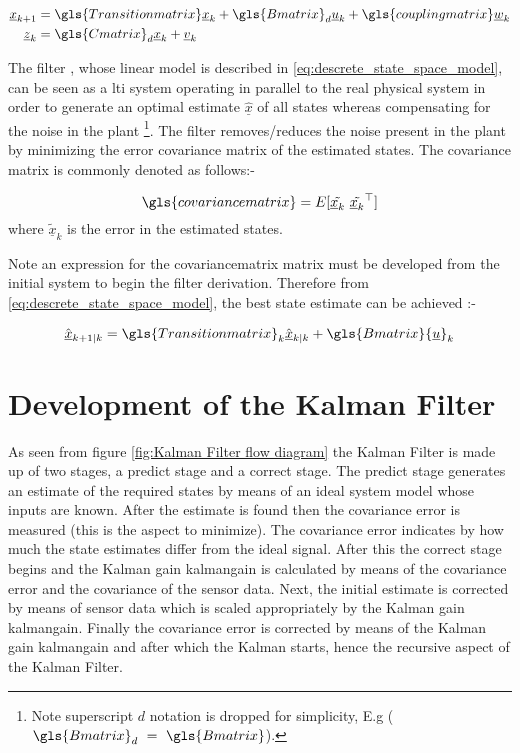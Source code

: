\begin{equation}\label{eq:descrete_state_space_model}
\begin{split}
\underline{x}_{k+1} &= \gls{Transitionmatrix} \underline{x}_k + \gls{Bmatrix}_d\underline{u}_k + \gls{couplingmatrix}\underline{w}_k \\
\underline{z}_{k}      &= \gls{Cmatrix}_d \underline{x}_k + \underline{v}_k
\end{split}
\end{equation}


The filter , whose linear model is described in \ref{eq:descrete_state_space_model}, can be seen as a \gls{lti}  system operating in parallel to the real physical system in order to generate an optimal estimate  $\underline{\hat{x}}$ of all states whereas compensating for the noise in the plant \footnote{Note superscript $d$ notation is dropped for simplicity, E.g ($\gls{Bmatrix} _d~=~ \gls{Bmatrix} $).}. The filter removes/reduces the noise present in the plant by minimizing the error covariance matrix of the estimated states. The covariance matrix is commonly denoted as follows:- 

\begin{equation}
\gls{covariancematrix}= E[\tilde{\underline{x}_k}~{\tilde{\underline{x}_k}}^\top]
\end{equation}
where ${\tilde{\underline{x}}}_k$ is the error in the estimated states.

Note an expression for the \gls{covariancematrix} matrix must be developed from the initial system to begin the filter derivation. Therefore from \eqref{eq:descrete_state_space_model}, the best state estimate can be achieved :-

\[\hat{\underline{x}}_{k+1|k}  =\gls{Transitionmatrix}_k\hat{\underline{x}}_{k|k} + \gls{Bmatrix}{\underline{u}}_k\]


\section{Development of the Kalman Filter}
As seen from figure \ref{fig:Kalman Filter flow diagram} the Kalman Filter is made up of two stages, a predict stage and a correct stage. The predict stage generates an estimate of the required states by means of an ideal system model whose inputs are known. After the estimate is found then the covariance error is measured (this is the aspect to minimize). The covariance error indicates by how much the state estimates differ from the ideal signal. After this the correct stage begins and the Kalman gain \gls{kalmangain} is calculated by means of the covariance error and the covariance of  the sensor data. Next, the initial estimate is corrected by means of sensor data which is scaled appropriately by the Kalman gain \gls{kalmangain}. Finally the covariance error is corrected by means of the Kalman gain \gls{kalmangain} and after which the Kalman starts, hence the recursive aspect of the Kalman Filter.  			



